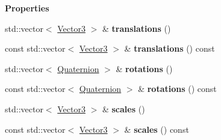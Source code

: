 \begin{Indent}\textbf{ Properties}\par
\begin{DoxyCompactItemize}
\item 
\mbox{\label{classrev_1_1_node_animation_ac38c1813303ee55a7a48d9a92caf2c6c}} 
std\+::vector$<$ \mbox{\hyperlink{classrev_1_1_vector}{Vector3}} $>$ \& {\bfseries translations} ()
\item 
\mbox{\label{classrev_1_1_node_animation_a3b211217add519f977ddd9eed4a1974c}} 
const std\+::vector$<$ \mbox{\hyperlink{classrev_1_1_vector}{Vector3}} $>$ \& {\bfseries translations} () const
\item 
\mbox{\label{classrev_1_1_node_animation_a9147e7d25cfe87d5997d1d5de127df39}} 
std\+::vector$<$ \mbox{\hyperlink{classrev_1_1_quaternion}{Quaternion}} $>$ \& {\bfseries rotations} ()
\item 
\mbox{\label{classrev_1_1_node_animation_aaee9f57b7aee594f2337dc92bfb676c6}} 
const std\+::vector$<$ \mbox{\hyperlink{classrev_1_1_quaternion}{Quaternion}} $>$ \& {\bfseries rotations} () const
\item 
\mbox{\label{classrev_1_1_node_animation_abd44d2591067fd41ad7f36efc6b49f3f}} 
std\+::vector$<$ \mbox{\hyperlink{classrev_1_1_vector}{Vector3}} $>$ \& {\bfseries scales} ()
\item 
\mbox{\label{classrev_1_1_node_animation_a18337f455e086a100f3a10d63e0eb701}} 
const std\+::vector$<$ \mbox{\hyperlink{classrev_1_1_vector}{Vector3}} $>$ \& {\bfseries scales} () const
\end{DoxyCompactItemize}
\end{Indent}
